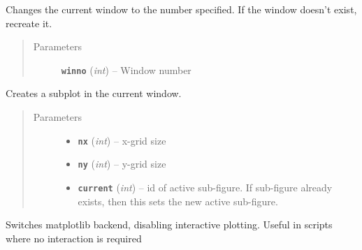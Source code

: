 \documentclass[letterpaper,10pt,english]{sphinxmanual}
\begin{document}

\begin{fulllineitems}
\label{index:facade.window}
Changes the current window to the number specified. If the window
doesn't exist, recreate it.
\begin{quote}\begin{description}
\item[{Parameters}] \leavevmode
\textbf{\texttt{winno}} (\emph{int}) -- Window number

\end{description}\end{quote}

\end{fulllineitems}


\begin{fulllineitems}
\label{index:facade.subfigure}
Creates a subplot in the current window.
\begin{quote}\begin{description}
\item[{Parameters}] \leavevmode\begin{itemize}
\item {} 
\textbf{\texttt{nx}} (\emph{int}) -- x-grid size

\item {} 
\textbf{\texttt{ny}} (\emph{int}) -- y-grid size

\item {} 
\textbf{\texttt{current}} (\emph{int}) -- id of active sub-figure.  If sub-figure already exists,
then this sets the new active sub-figure.

\end{itemize}

\end{description}\end{quote}

\end{fulllineitems}


\begin{fulllineitems}
\label{index:facade.switch_nongui}
Switches matplotlib backend, disabling interactive plotting.
Useful in scripts where no interaction is required

\end{fulllineitems}
\end{document}
